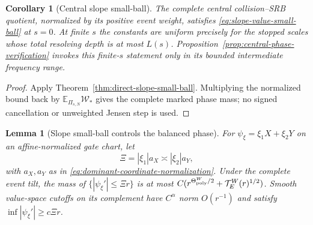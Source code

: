 \documentclass[11pt]{article}
\newtheorem{lemma}[theorem]{Lemma}
\newtheorem{corollary}[theorem]{Corollary}
\begin{document}
\begin{corollary}[Central slope small-ball]
\label{cor:central-g2}
The complete central collision--SRB quotient, normalized by its positive
event weight, satisfies
\eqref{eq:slope-value-small-ball} at $s=0$.  At finite $s$ the constants are
uniform precisely for the stopped scales whose total resolving depth is at
most $L(s)$.  Proposition~\ref{prop:central-phase-verification} invokes this
finite-$s$ statement only in its bounded intermediate frequency range.
\end{corollary}

\begin{proof}
Apply Theorem~\ref{thm:direct-slope-small-ball}.  Multiplying the normalized
bound back by $\mathbb E_{\Pi_{s,N}}\mathscr W_*$ gives the complete marked
phase mass; no signed cancellation or unweighted Jensen step is used.
\end{proof}

\begin{lemma}[Slope small-ball controls the balanced phase]
\label{lem:slope-good-bad-phase}
For $\psi_\xi=\xi_1X+\xi_2Y$ on an affine-normalized gate chart, let
\begin{equation}
\label{eq:balanced-physical-frequency}
 \Xi=|\xi_1|a_X\asymp|\xi_2|a_Y,
\end{equation}
with $a_X,a_Y$ as in \eqref{eq:dominant-coordinate-normalization}.  Under
the complete event tilt, the mass of $\{|\psi_\xi'|\le\Xi r\}$ is at most
$C(r^{\Theta_{\rm poly}^{W}/2}+\mathcal T_E^{W}(r)^{1/2})$.  Smooth value-space cutoffs on its complement have
$C^\alpha$ norm $O(r^{-1})$ and satisfy
$\inf|\psi_\xi'|\ge c\Xi r$.
\end{lemma}
\end{document}
